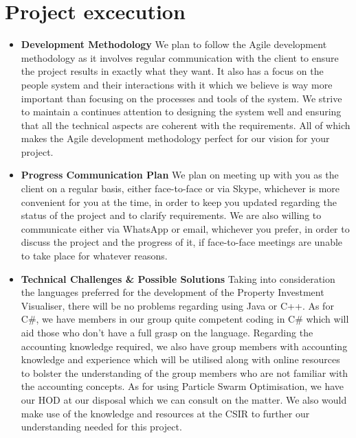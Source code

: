 \documentclass{article}
\begin{document}
	\section{Project excecution}
	\begin{itemize}
		\item \textbf{Development Methodology} \newline \newline
		We plan to follow the Agile development methodology as it involves regular communication with the client to ensure the project results in exactly what they want. It also has a focus on the people system and their interactions with it which we believe is way more important than focusing on the processes and tools of the system. We strive to maintain a continues attention to designing the system well and ensuring that all the technical aspects are coherent with the requirements. All of which makes the Agile development methodology perfect for our vision for your project.
		
		\item \textbf{Progress Communication Plan} \newline \newline
		We plan on meeting up with you as the client on a regular basis, either face-to-face or via Skype, whichever is more convenient for you at the time, in order to keep you updated regarding the status of the project and to clarify requirements. We are also willing to communicate either via WhatsApp or email, whichever you prefer, in order to discuss the project and the progress of it, if face-to-face meetings are unable to take place for whatever reasons.

		\item \textbf{Technical Challenges \& Possible Solutions} \newline \newline
		Taking into consideration the languages preferred for the development of the Property Investment Visualiser, there will be no problems regarding using Java or C++. As for C\#, we have members in our group quite competent coding in C\# which will aid those who don't have a full grasp on the language. Regarding the accounting knowledge required, we also have group members with accounting knowledge and experience which will be utilised along with online resources to bolster the understanding of the group members who are not familiar with the accounting concepts. \newline
		As for using Particle Swarm Optimisation, we have our HOD at our disposal which we can consult on the matter. We also would make use of the knowledge and resources at the CSIR to further our understanding needed for this project.


\end{itemize}
\end{document}
